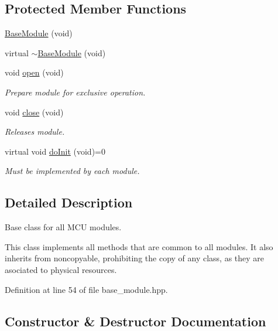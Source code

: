 \subsection*{Protected Member Functions}
\begin{DoxyCompactItemize}
\item 
\hyperlink{classyahal_1_1mcu_1_1_base_module_a195c83d8bc809e4d251b667f99a4c743}{Base\+Module} (void)
\item 
virtual \hyperlink{classyahal_1_1mcu_1_1_base_module_a4172f456ed518f9a75053c3749882d95}{$\sim$\+Base\+Module} (void)
\item 
void \hyperlink{classyahal_1_1mcu_1_1_base_module_a01542ca9289d485181f2600ffbfb8d16}{open} (void)
\begin{DoxyCompactList}\small\item\em Prepare module for exclusive operation. \end{DoxyCompactList}\item 
void \hyperlink{classyahal_1_1mcu_1_1_base_module_a1bb5f4e1f70eac7eee3aba55b46dd7f0}{close} (void)
\begin{DoxyCompactList}\small\item\em Releases module. \end{DoxyCompactList}\item 
virtual void \hyperlink{classyahal_1_1mcu_1_1_base_module_a8416501d52480b5d617115b1e248b471}{do\+Init} (void)=0
\begin{DoxyCompactList}\small\item\em Must be implemented by each module. \end{DoxyCompactList}\end{DoxyCompactItemize}


\subsection{Detailed Description}
Base class for all M\+C\+U modules. 

This class implements all methods that are common to all modules. It also inherits from noncopyable, prohibiting the copy of any class, as they are asociated to physical resources. 

Definition at line 54 of file base\+\_\+module.\+hpp.



\subsection{Constructor \& Destructor Documentation}
\hypertarget{classyahal_1_1mcu_1_1_base_module_a195c83d8bc809e4d251b667f99a4c743}{}
